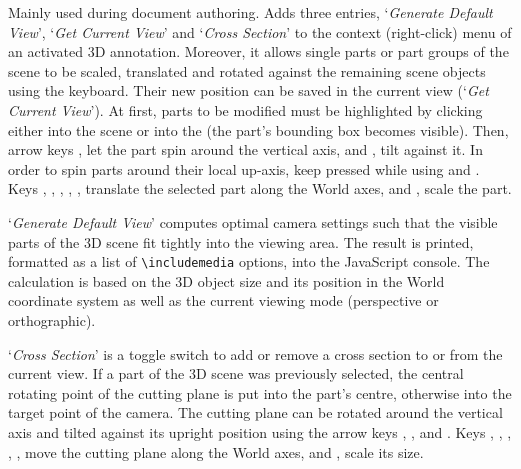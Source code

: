 \documentclass[a4paper]{article}
\begin{document}
Mainly used during document authoring. Adds three entries, `\emph{\sffamily Generate Default View}', `\emph{\sffamily Get Current View}' and `\emph{\sffamily Cross Section}' to the context (right-click) menu of an activated 3D annotation. Moreover, it allows single parts or part groups of the scene to be scaled, translated and rotated against the remaining scene objects using the keyboard. Their new position can be saved in the current view (`\emph{\sffamily Get Current View}'). At first, parts to be modified must be highlighted by clicking either into the scene or into the  (the part's bounding box becomes visible). Then, arrow keys \keys{\arrowkeyleft}, \keys{\arrowkeyright} let the part spin around the vertical axis, and \keys{\arrowkeyup}, \keys{\arrowkeydown} tilt against it. In order to spin parts around their local up-axis, keep \keys{\ctrl} pressed while using \keys{\arrowkeyleft} and \keys{\arrowkeyright}. Keys , , , , ,  translate the selected part along the World axes, and ,  scale the part.

`\emph{\sffamily Generate Default View}' computes optimal camera settings such that the visible parts of the 3D scene fit tightly into the viewing area. The result is printed, formatted as a list of \verb+\includemedia+ options, into the JavaScript console. The calculation is based on the 3D object size and its position in the World coordinate system as well as the current viewing mode (perspective or orthographic).

`\emph{\sffamily Cross Section}' is a toggle switch to add or remove a cross section to or from the current view. If a part of the 3D scene was previously selected, the central rotating point of the cutting plane is put into the part's centre, otherwise into the target point of the camera. The cutting plane can be rotated around the vertical axis and tilted against its upright position using the arrow keys \keys{\arrowkeyleft}, \keys{\arrowkeyright}, \keys{\arrowkeyup} and \keys{\arrowkeydown}. Keys , , , , ,  move the cutting plane along the World axes, and ,  scale its size.
\end{document}
